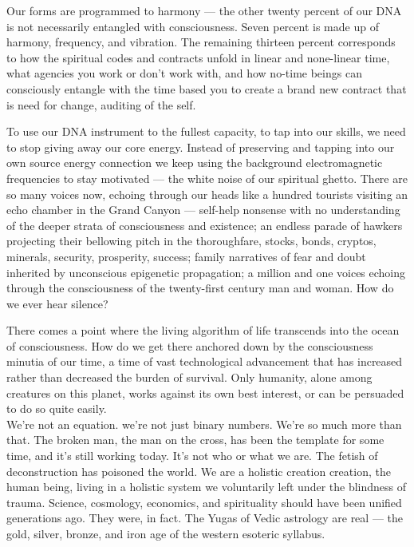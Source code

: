 \documentclass[letterpaper,11pt,twoside,titlepage,onecolumn,openany]{book}
\begin{document}
Our forms are programmed to harmony --- the other twenty percent of our
DNA is not necessarily entangled with consciousness. Seven percent is
made up of harmony, frequency, and vibration. The remaining thirteen
percent corresponds to how the spiritual codes and contracts unfold in
linear and none-linear time, what agencies you work or don't work with,
and how no-time beings can consciously entangle with the time based you
to create a brand new contract that is need for change, auditing of the
self.

To use our DNA instrument to the fullest capacity, to tap into our
skills, we need to stop giving away our core energy. Instead of
preserving and tapping into our own source energy connection we keep
using the background electromagnetic frequencies to stay motivated ---
the white noise of our spiritual ghetto. There are so many voices now,
echoing through our heads like a hundred tourists visiting an echo
chamber in the Grand Canyon --- self-help nonsense with no understanding
of the deeper strata of consciousness and existence; an endless parade
of hawkers projecting their bellowing pitch in the thoroughfare, stocks,
bonds, cryptos, minerals, security, prosperity, success; family
narratives of fear and doubt inherited by unconscious epigenetic
propagation; a million and one voices echoing through the consciousness
of the twenty-first century man and woman. How do we ever hear silence?

There comes a point where the living algorithm of life transcends into
the ocean of consciousness. How do we get there anchored down by the
consciousness minutia of our time, a time of vast technological
advancement that has increased rather than decreased the burden of
survival. Only humanity, alone among creatures on this planet, works
against its own best interest, or can be persuaded to do so quite
easily.\\
We're not an equation. we're not just binary numbers. We're so much more
than that. The broken man, the man on the cross, has been the template
for some time, and it's still working today. It's not who or what we
are. The fetish of deconstruction has poisoned the world. We are a
holistic creation creation, the human being, living in a holistic system
we voluntarily left under the blindness of trauma. Science, cosmology,
economics, and spirituality should have been unified generations ago.
They were, in fact. The Yugas of Vedic astrology are real --- the gold,
silver, bronze, and iron age of the western esoteric syllabus.
\end{document}
